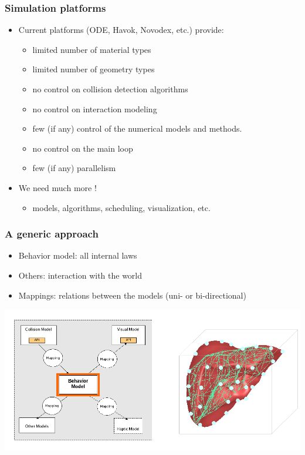 \documentclass[a4paper,compress]{beamer}
\begin{document}
\begin{frame}
\frametitle{Simulation platforms}
\begin{itemize}
\item Current platforms (ODE, Havok, Novodex, etc.) provide:
\begin{itemize}
\item limited number of material types
\item limited number of geometry types
\item no control on collision detection algorithms
\item no control on interaction modeling
\item few (if any) control of the numerical models and methods.
\item no control on the main loop
\item few (if any) parallelism
\end{itemize}
\item We need much more !
\begin{itemize}
 \item models, algorithms, scheduling, visualization, etc.
\end{itemize}

\end{itemize}
\end{frame}


\begin{frame}
\frametitle{A generic approach}
\begin{itemize}
\item Behavior model: all internal laws
\item Others: interaction with the world
\item Mappings: relations between the models (uni- or bi-directional)
\end{itemize}
\begin{center}
 \includegraphics[width=\linewidth]{multimodal.png}
\end{center}

\end{frame}
\end{document}
